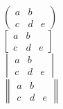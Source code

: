 \documentclass[12pt,a4paper]{article}
\begin{document}
$\begin{pmatrix}
a & b \\        %
c & d & e
\end{pmatrix}$ \\


$\begin{bmatrix}
a & b \\        %
c & d & e
\end{bmatrix}$ \\

$\begin{vmatrix}
a & b \\        %
c & d & e
\end{vmatrix}$ \\

$\begin{Vmatrix}
a & b \\        %
c & d & e
\end{Vmatrix}$ \\
\end{document}
